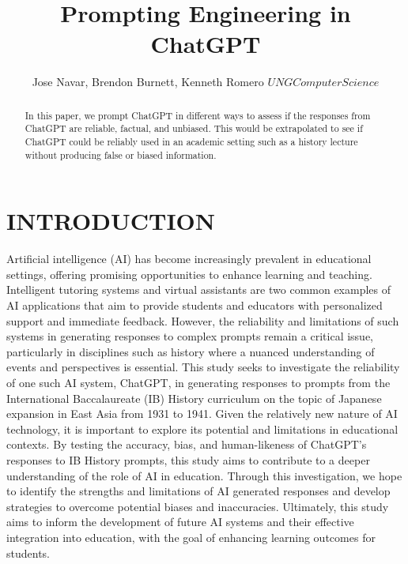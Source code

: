 \documentclass[letterpaper, 10 pt, conference]{ieeeconf}  %
\title{\LARGE \bf
Prompting Engineering in ChatGPT
}
\author{Jose Navar, Brendon Burnett, Kenneth Romero ${UNG Computer Science}$%
}
\begin{document}
\maketitle
\thispagestyle{empty}
\pagestyle{empty}


\begin{abstract}

In this paper, we prompt ChatGPT in different ways to assess if the responses from ChatGPT are reliable, factual, and
unbiased. This would be extrapolated to see if ChatGPT could be reliably used in an academic setting such as a history lecture
without producing false or biased information.


\end{abstract}


\section{INTRODUCTION}

Artificial intelligence (AI) has become increasingly prevalent in educational settings, offering promising opportunities
to enhance learning and teaching. Intelligent tutoring systems and virtual assistants are two common examples of AI applications
that aim to provide students and educators with personalized support and immediate feedback. However, the reliability and
limitations of such systems in generating responses to complex prompts remain a critical issue, particularly in disciplines such as
history where a nuanced understanding of events and perspectives is essential. This study seeks to investigate the reliability of one
such AI system, ChatGPT, in generating responses to prompts from the International Baccalaureate (IB) History curriculum on the
topic of Japanese expansion in East Asia from 1931 to 1941.
Given the relatively new nature of AI technology, it is important to explore its potential and limitations in educational contexts. By
testing the accuracy, bias, and human-likeness of ChatGPT’s responses to IB History prompts, this study aims to contribute to a
deeper understanding of the role of AI in education. Through this investigation, we hope to identify the strengths and limitations
of AI generated responses and develop strategies to overcome potential biases and inaccuracies. Ultimately, this study aims to
inform the development of future AI systems and their effective integration into education, with the goal of enhancing learning
outcomes for students.
\end{document}
